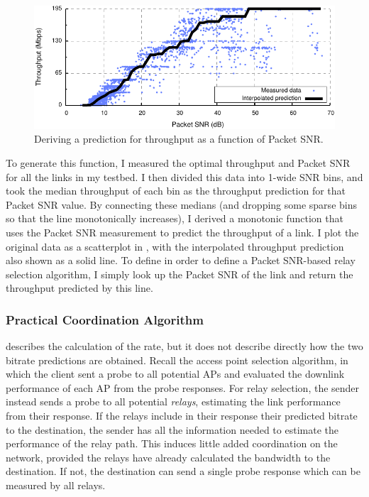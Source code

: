 \begin{figure}[t]
	\centering
	\includegraphics[width=\textwidth]{figures/applications/snr_vs_mbps.pdf}
	\caption[Deriving a prediction for throughput as a function of Packet SNR]{\label{fig:snr_vs_mbps}Deriving a prediction for throughput as a function of Packet SNR.}
\end{figure}

To generate this function, I measured the optimal throughput and Packet SNR for all the links in my testbed. I then divided this data into 1\dB-wide SNR bins, and took the median throughput of each bin as the throughput prediction for that Packet SNR value. By connecting these medians (and dropping some sparse bins so that the line monotonically increases), I derived a monotonic function that uses the Packet SNR measurement to predict the throughput of a link. I plot the original data as a scatterplot in , with the interpolated throughput prediction also shown as a solid line. To define  in order to define a Packet SNR-based relay selection algorithm, I simply look up the Packet SNR of the link and return the throughput predicted by this line.

\subsubsection{Practical Coordination Algorithm}
 describes the calculation of the rate, but it does not describe directly how the two bitrate predictions are obtained. Recall the access point selection algorithm, in which the client sent a probe to all potential APs and evaluated the downlink performance of each AP from the probe responses. For relay selection, the sender instead sends a probe to all potential \emph{relays}, estimating the link performance from their response. If the relays include in their response their predicted bitrate to the destination, the sender has all the information needed to estimate the performance of the relay path. This induces little added coordination on the network, provided the relays have already calculated the bandwidth to the destination. If not, the destination can send a single probe response which can be measured by all relays.

